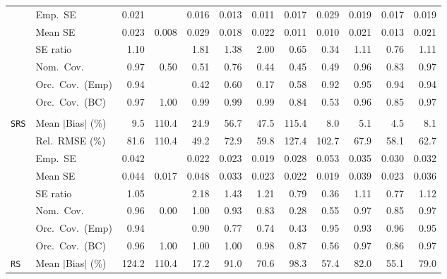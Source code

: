 \begin{landscape}
\begin{longtable}{llrrrrrrrrrr}
 & Emp.\ SE & 0.021 &  & 0.016 & 0.013 & 0.011 & 0.017 & 0.029 & 0.019 & 0.017 & 0.019 \\
 & Mean SE & 0.023 & 0.008 & 0.029 & 0.018 & 0.022 & 0.011 & 0.010 & 0.021 & 0.013 & 0.021 \\
 & SE ratio & \cellcolor{rankone}1.10 &  & 1.81 & 1.38 & 2.00 & 0.65 & 0.34 & \cellcolor{ranktwo}1.11 & 0.76 & \cellcolor{rankthree}1.11 \\
 & Nom.\ Cov. & \cellcolor{rankthree}0.97 & 0.50 & 0.51 & 0.76 & 0.44 & 0.45 & 0.49 & \cellcolor{rankone}0.96 & 0.83 & \cellcolor{ranktwo}0.97 \\
 & Orc.\ Cov.\ (Emp) & \cellcolor{rankthree}0.94 &  & 0.42 & 0.60 & 0.17 & 0.58 & 0.92 & \cellcolor{rankone}0.95 & 0.94 & \cellcolor{ranktwo}0.94 \\
 & Orc.\ Cov.\ (BC) & \cellcolor{rankthree}0.97 & 1.00 & 0.99 & 0.99 & 0.99 & 0.84 & 0.53 & \cellcolor{rankone}0.96 & 0.85 & \cellcolor{ranktwo}0.97 \\
\addlinespace[2pt]
\multicolumn{12}{l}{\textbf{Continuous Phase-One Covariates}} \\
\addlinespace[2pt]
\quad \texttt{SRS} & Mean $|$Bias$|$ (\%) & 9.5 & 110.4 & 24.9 & 56.7 & 47.5 & 115.4 & \cellcolor{rankthree}8.0 & \cellcolor{ranktwo}5.1 & \cellcolor{rankone}4.5 & 8.1 \\
 & Rel.\ RMSE (\%) & 81.6 & 110.4 & \cellcolor{rankone}49.2 & 72.9 & \cellcolor{rankthree}59.8 & 127.4 & 102.7 & 67.9 & \cellcolor{ranktwo}58.1 & 62.7 \\
 & Emp.\ SE & 0.042 &  & 0.022 & 0.023 & 0.019 & 0.028 & 0.053 & 0.035 & 0.030 & 0.032 \\
 & Mean SE & 0.044 & 0.017 & 0.048 & 0.033 & 0.023 & 0.022 & 0.019 & 0.039 & 0.023 & 0.036 \\
 & SE ratio & \cellcolor{rankone}1.05 &  & 2.18 & 1.43 & 1.21 & 0.79 & 0.36 & \cellcolor{ranktwo}1.11 & 0.77 & \cellcolor{rankthree}1.12 \\
 & Nom.\ Cov. & \cellcolor{rankone}0.96 & 0.00 & 1.00 & \cellcolor{ranktwo}0.93 & 0.83 & 0.28 & 0.55 & \cellcolor{rankthree}0.97 & 0.85 & 0.97 \\
 & Orc.\ Cov.\ (Emp) & \cellcolor{rankthree}0.94 &  & 0.90 & 0.77 & 0.74 & 0.43 & \cellcolor{ranktwo}0.95 & 0.93 & 0.96 & \cellcolor{rankone}0.95 \\
 & Orc.\ Cov.\ (BC) & \cellcolor{rankone}0.96 & 1.00 & 1.00 & 1.00 & 0.98 & 0.87 & 0.56 & \cellcolor{rankthree}0.97 & 0.86 & \cellcolor{ranktwo}0.97 \\
\addlinespace[2pt]
\quad \texttt{RS} & Mean $|$Bias$|$ (\%) & 124.2 & 110.4 & \cellcolor{rankone}17.2 & 91.0 & 70.6 & 98.3 & \cellcolor{rankthree}57.4 & 82.0 & \cellcolor{ranktwo}55.1 & 79.0 \\

\end{longtable}
\end{landscape}
